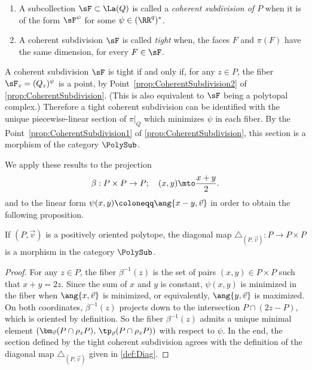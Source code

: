 \skpt
\begin{definition}\label{def:Coherent}
\begin{enumerate}
\item A subcollection $\sF\subset\La(Q)$ is called a \emph{coherent subdivision of $P$} when it is of the form $\sF^\psi$ for some $\psi\in (\RR^q)^{\ast}$.
\item A coherent subdivision $\sF$ is called \emph{tight} when, the faces $F$ and $\pi(F)$ have the same dimension, for every $F\in \sF$.
\end{enumerate}
\end{definition}

A coherent subdivision $\sF$ is tight if and only if, for any $z\in P$, the fiber $\sF_z = (Q_z)^\psi$ is a point, by Point~\eqref{prop:CoherentSubdivision2} of \cref{prop:CoherentSubdivision}. (This is also equivalent to $\sF$ being a polytopal complex.)
Therefore a tight coherent subdivision can be identified with the unique piecewise-linear section of $\pi|_Q$ which minimizes $\psi$ in each fiber.
By the Point~\eqref{prop:CoherentSubdivision1} of \cref{prop:CoherentSubdivision}, this section is a morphism of the category $\PolySub$.

We apply these results to the projection\vspace*{-3pt}
\[\beta : P\times P\to P ;\quad (x, y)\mto \frac{x+y}{2}.\]
and to the linear form $\psi(x, y)\coloneqq \ang{x-y, \vec v}$ in order to obtain the following proposition.

\begin{proposition}\label{prop:DiaginPoly}
If $(P, \vec v)$ is a positively oriented polytope, the diagonal map $\triangle_{(P, \vec v)}: P\to P\times P$ is a morphism in the category $\PolySub$.
\end{proposition}

\begin{proof}
For any $z\in P$, the fiber $\beta^{-1}(z)$ is the set of pairs $(x, y)\in P\times P$ such that $x+y = 2z$. Since the sum of $x$ and $y$ is constant, $\psi(x, y)$ is minimized in the fiber when $\ang{x, \vec v}$ is minimized, or equivalently, $\ang{y, \vec v}$ is maximized. On both coordinates, $\beta^{-1}(z)$ projects down to the intersection $P\cap (2z-P)$, which is oriented by definition.
So the fiber $\beta^{-1}(z)$ admits a unique minimal element $\left(\bm_{\vec v}(P\cap \rho_z P),\, \tp_{\vec v}(P\cap \rho_z P)\right)$ with respect to $\psi$. In the end, the section defined by the tight coherent subdivision agrees with the definition of the diagonal map $\triangle_{(P, \vec v)}$ given in \cref{def:Diag}.
\end{proof}

